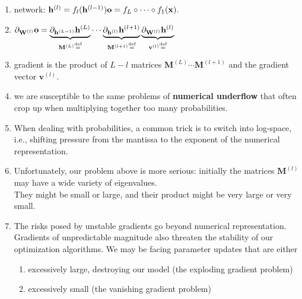 \begin{enumerate}[itemsep=0.2cm]
    \item network:
    $
        \hfill
        \mathbf{h}^{(l)} = f_l (\mathbf{h}^{(l-1)})
        \hfill
        \mathbf{o} = f_L \circ \cdots \circ f_1(\mathbf{x}).
        \hfill
    $

    \item[] 
    $
        \hfill
        \partial_{\mathbf{W}^{(l)}} \mathbf{o} 
        = \underbrace{\partial_{\mathbf{h}^{(L-1)}} \mathbf{h}^{(L)}}_{ \mathbf{M}^{(L)} \stackrel{\textrm{def}}{=}} 
        \cdots 
        \underbrace{\partial_{\mathbf{h}^{(l)}} \mathbf{h}^{(l+1)}}_{ \mathbf{M}^{(l+1)} \stackrel{\textrm{def}}{=}} 
        \underbrace{\partial_{\mathbf{W}^{(l)}} \mathbf{h}^{(l)}}_{ \mathbf{v}^{(l)} \stackrel{\textrm{def}}{=}}
        \hfill
    $
    
    \item gradient is the product of $L-l$ matrices $\mathbf{M}^{(L)} \cdots \mathbf{M}^{(l+1)}$ and the gradient vector $\mathbf{v}^{(l)}$.

    \item we are susceptible to the same problems of \textbf{numerical underflow} that often crop up when multiplying together too many probabilities. 
    
    \item When dealing with probabilities, a common trick is to switch into log-space, i.e., shifting pressure from the mantissa to the exponent of the numerical representation. 
    
    \item Unfortunately, our problem above is more serious: initially the matrices $\mathbf{M}^{(l)}$ may have a wide variety of eigenvalues. \\
    They might be small or large, and their product might be very large or very small.

    \item The risks posed by unstable gradients go beyond numerical representation. Gradients of unpredictable magnitude also threaten the stability of our optimization algorithms. We may be facing parameter updates that are either
    \begin{enumerate}
        \item excessively large, destroying our model (the exploding gradient problem) 
        
        \item  excessively small (the vanishing gradient problem)


\end{enumerate}
\end{enumerate}

